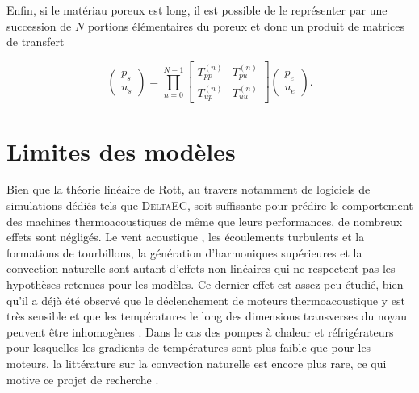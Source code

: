 Enfin, si le matériau poreux est long, il est possible de le représenter par une succession de $N$ portions élémentaires du poreux et donc un produit de matrices de transfert

\begin{equation}
\begin{pmatrix}
p_s\\
u_s
\end{pmatrix} = \prod_{n=0}^{N-1} \begin{bmatrix}
T_{pp}^{(n)} & T_{pu}^{(n)}\\
T_{up}^{(n)} & T_{uu}^{(n)}
\end{bmatrix}\begin{pmatrix}
p_e\\
u_e
\end{pmatrix}.
\label{eq:TMatrix_prod_TppTuu}
\end{equation}

\section{Limites des modèles}


Bien que la théorie linéaire de Rott, au travers notamment de logiciels de simulations dédiés tels que \textsc{DeltaEC}, soit suffisante pour prédire le comportement des machines thermoacoustiques de même que leurs performances, de nombreux effets sont négligés. Le vent acoustique \cite{so_internal_2006, bailliet_acoustic_2001, ramadan_experimental_2018}, les écoulements turbulents et la formations de tourbillons, la génération d'harmoniques supérieures et la convection naturelle sont autant d'effets non linéaires qui ne respectent pas les hypothèses retenues pour les modèles. Ce dernier effet est assez peu étudié, bien qu'il a déjà été observé que le déclenchement de moteurs thermoacoustique y est très sensible et que les températures le long des dimensions transverses du noyau peuvent être inhomogènes \cite{ross_influence_2003, ramadan_experimental_2018, hireche_numerical_2019}. Dans le cas des pompes à chaleur et réfrigérateurs pour lesquelles les gradients de températures sont plus faible que pour les moteurs, la littérature sur la convection naturelle est encore plus rare, ce qui motive ce projet de recherche \cite{zhang_novel_2011, babaei_investigation_2010}.


